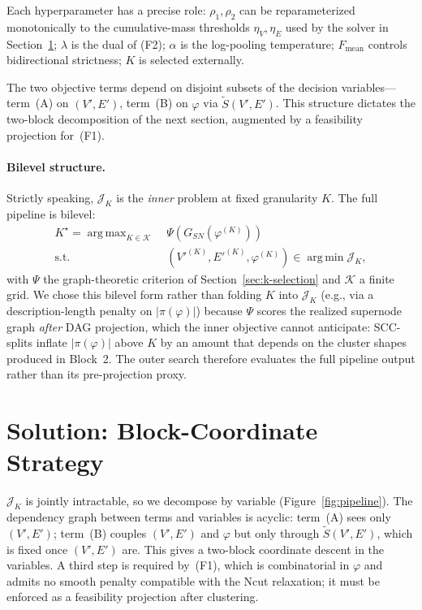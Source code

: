 \documentclass[table, 11pt]{article}
\DeclareMathOperator*{\argmin}{arg\,min}
\DeclareMathOperator*{\argmax}{arg\,max}
\begin{document}
Each hyperparameter has a precise role: $\rho_1, \rho_2$ can be
reparameterized monotonically to the cumulative-mass thresholds
$\eta_V, \eta_E$ used by the solver in
Section~\ref{sec:solution}; $\lambda$ is the dual of (F2); $\alpha$
is the log-pooling temperature; $F_{\text{mean}}$ controls
bidirectional strictness; $K$ is selected externally.

The two objective terms depend on disjoint subsets of the decision
variables---term~(A) on $(V', E')$, term~(B) on $\varphi$ via
$\tilde S(V', E')$. This structure dictates the two-block
decomposition of the next section, augmented by a feasibility
projection for~(F1).

\paragraph{Bilevel structure.}
Strictly speaking, $\mathcal{J}_K$ is the \emph{inner} problem at
fixed granularity $K$. The full pipeline is bilevel:
\begin{equation}
\begin{aligned}
K^\star = \argmax_{K \in \mathcal{K}} \;
&\Psi\!\left(G_{SN}(\varphi^{(K)})\right) \\
\text{s.t.} \;\;
&(V'^{(K)}, E'^{(K)}, \varphi^{(K)}) \in \argmin \mathcal{J}_K,
\end{aligned}
\label{eq:bilevel}
\end{equation}
with $\Psi$ the graph-theoretic criterion of
Section~\ref{sec:k-selection} and $\mathcal{K}$ a finite grid. We
chose this bilevel form rather than folding $K$ into $\mathcal{J}_K$
(e.g., via a description-length penalty on $|\pi(\varphi)|$) because
$\Psi$ scores the realized supernode graph \emph{after} DAG
projection, which the inner objective cannot anticipate: SCC-splits
inflate $|\pi(\varphi)|$ above $K$ by an amount that depends on the
cluster shapes produced in Block~2. The outer search therefore
evaluates the full pipeline output rather than its pre-projection
proxy.

\section{Solution: Block-Coordinate Strategy}\label{sec:solution}



$\mathcal{J}_K$ is jointly intractable, so we decompose by variable
(Figure~\ref{fig:pipeline}). The dependency graph between terms and
variables is acyclic: term~(A) sees only $(V', E')$; term~(B)
couples $(V', E')$ and $\varphi$ but only through
$\tilde S(V', E')$, which is fixed once $(V', E')$ are. This gives
a two-block coordinate descent in the variables. A third step is
required by~(F1), which is combinatorial in $\varphi$ and admits no
smooth penalty compatible with the Ncut relaxation; it must be
enforced as a feasibility projection after clustering.
\end{document}
